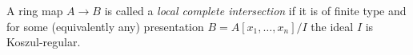 \begin{definition}
\label{definition-local-complete-intersection}
A ring map $A \to B$ is called a {\it local complete intersection}
if it is of finite type and for some (equivalently any) presentation
$B = A[x_1, \ldots, x_n]/I$ the ideal $I$ is Koszul-regular.
\end{definition}